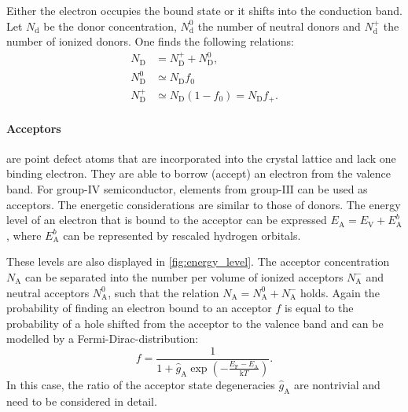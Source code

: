 Either the electron occupies the bound state or it shifts into the
conduction band.
Let $N_\mathrm{d}$ be the donor concentration, $N_\mathrm{d}^0$ the
number of neutral donors and $N_\mathrm{d}^+$ the number of ionized donors.
One finds the following relations:
\begin{align}
	N_{\mathrm{D}}     & =N_{\mathrm{D}}^{+}+N_{\mathrm{D}}^{0},        \\
	N_{\mathrm{D}}^{0} & \simeq N_{\mathrm{D}}f_0                             \\
	\label{eq:ndplus}
	N_{\mathrm{D}}^{+} & \simeq N_{\mathrm{D}}(1-f_{0}) =N_{\mathrm{D}}f_{+}.
\end{align}

\paragraph{Acceptors} are point defect atoms that are incorporated
into the crystal
lattice and lack one binding electron.
They are able to borrow (accept) an electron from the valence band.
For group-$\mathrm{IV}$ semiconductor, elements from group-$\mathrm{III}$
can be used as acceptors.
The energetic considerations are similar to those of donors.
The energy level of an electron that is bound to the acceptor can be
expressed
$E_{\mathrm{A}}=E_{\mathrm{V}}+E_{\mathrm{A}}^{b}$,
where $E_\mathrm{A}^b$ can be represented by rescaled
hydrogen orbitals.

These levels are also displayed in \cref{fig:energy_level}.
The acceptor concentration $N_\mathrm{A}$ can be separated into
the number per volume of ionized acceptors $N_\mathrm{A}^-$ and neutral
acceptors $N_\mathrm{A}^0$, such that the relation
$N_{\mathrm{A}}=N_{\mathrm{A}}^{0}+N_{\mathrm{A}}^{-}$ holds.
Again the probability of finding an electron bound to an acceptor $f$ is
equal to the probability of a hole shifted from the acceptor to the
valence band and can be modelled by a Fermi-Dirac-distribution:
\begin{equation}
	f = \frac{1}{1+\hat{g}_{\mathrm{A}}\exp\left( -
	\frac{E_{\mathrm{F}}-E_{\mathrm{A}}}{\mathrm{k}T} \right)}.
\end{equation}
In this case, the ratio of the acceptor state degeneracies
$\hat{g}_\mathrm{A}$ are nontrivial and need to be considered in detail.

